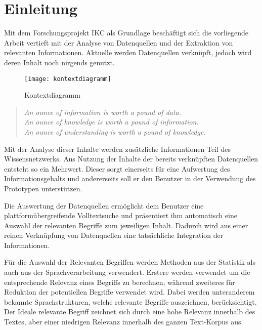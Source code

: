 \chapter{Einleitung}

Mit dem Forschungsprojekt \gls{IKC} als Grundlage beschäftigt sich die vorliegende Arbeit vertieft mit der Analyse von Datenquellen und der Extraktion von relevanten Informationen. Aktuelle werden Datenquellen verknüpft, jedoch wird deren Inhalt noch nirgends genutzt. 

\begin{figure}[ht]
\centering
\texttt{[image: kontextdiagramm]}
\caption{Kontextdiagramm}
\label{fig:kontextdiagramm}
\end{figure}

\begin{quote}
\textit{An ounce of information is worth a pound of data.}\\
\textit{An ounce of knowledge is worth a pound of information.}\\
\textit{An ounce of understanding is worth a pound of knowledge.}\\
\end{quote}

Mit der Analyse dieser Inhalte werden zusätzliche Informationen Teil des Wissensnetzwerks. Aus Nutzung der Inhalte der bereits ver\-knüpf\-ten Datenquellen entsteht so ein Mehrwert. Dieser sorgt einerseits für eine Aufwertung des Informationsgehalts und andererseits soll er den Benutzer in der Verwendung des Prototypen unterstützen.

Die Auswertung der Datenquellen ermöglicht dem Benutzer eine plattformübergreifende Volltextsuche und präsentiert ihm automatisch eine Auswahl der relevanten Begriffe zum jeweiligen Inhalt. Dadurch wird aus einer reinen Verknüpfung von Datenquellen eine tatsächliche Integration der Informationen.

Für die Auswahl der Relevanten Begriffen werden Methoden aus der Statistik als auch aus der Sprachverarbeitung verwendert. Erstere werden verwendet um die entsprechende Relevanz eines Begriffs zu berechnen, während zweiteres für Reduktion der potentiellen Begriffe verwendet wird. Dabei werden unteranderem bekannte Sprachstrukturen, welche relevante Begriffe auszeichnen, berücksichtigt. Der Ideale relevante Begriff zeichnet sich durch eine hohe Relevanz innerhalb des Textes, aber einer niedrigen Relevanz innerhalb des ganzen \gls{Text-Korpus} aus.




